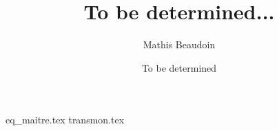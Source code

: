 \documentclass{article}
\title{\textbf{To be determined...}}
\author{Mathis Beaudoin}
\date{To be determined}
\numberwithin{equation}{section}
\begin{document}

\maketitle
\clearpage

\tableofcontents
\clearpage


\newpage
{}
\setcounter{page}{1}

{eq_maitre.tex}
{transmon.tex}
\end{document}
